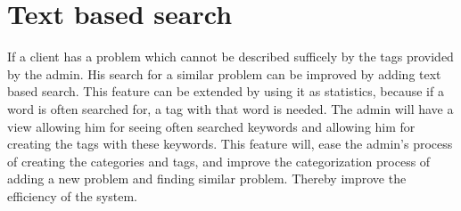 \section{Text based search}
\label{sec:text_based_search}
If a client has a problem which cannot be described sufficely by the tags provided by the admin. 
His search for a similar problem can be improved by adding text based search. 
This feature can be extended by using it as statistics, because if a word is often searched for, a tag with that word is needed. 
The admin will have a view allowing him for seeing often searched keywords and allowing him for creating the tags with these keywords.
This feature will, ease the admin's process of creating the categories and tags, and improve the categorization process of adding a new problem and finding similar problem. Thereby improve the efficiency of the system.  
